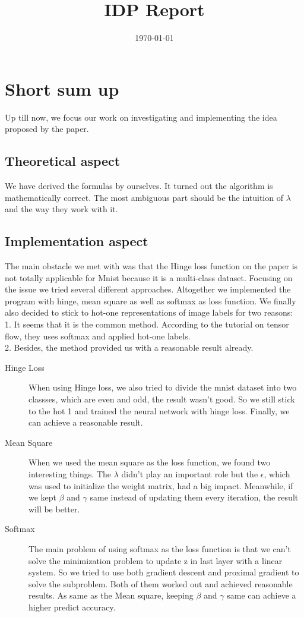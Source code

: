 \documentclass{article}
\title{IDP Report}
\date{\today}
\begin{document}
\maketitle

\section{Short sum up}
Up till now, we focus our work on investigating and implementing the idea proposed by the paper.
\subsection{Theoretical aspect}
We have derived the formulas by ourselves. It turned out the algorithm is mathematically correct. The most ambiguous part should be the intuition of $\lambda$ and the way they work with it. 

\subsection{Implementation aspect}
The main obstacle we met with was that the Hinge loss function on the paper is not totally applicable for Mnist  because it is a multi-class dataset. Focusing on the issue we tried several different approaches. Altogether we implemented the program with hinge, mean square as well as softmax as loss function. We finally also decided to stick to hot-one representations of image labels for two reasons:\\
1. It seems that it is the common method. According to the tutorial on tensor flow, they uses softmax and applied hot-one labels.\\
2. Besides, the method provided us with a reasonable result already.

\begin{description}
\item[Hinge Loss]
When using Hinge loss, we also tried to divide the mnist dataset into two classses, which are even and odd, the result wasn't good. So we still stick to the hot 1 and trained the neural network with hinge loss. Finally, we can achieve a reasonable result.

\item[Mean Square]
When we used the mean square as the loss function, we found two interesting things. The $\lambda$ didn't play an important role but the $\epsilon$, which was used to initialize the weight matrix, had a big impact. Meanwhile, if we kept $\beta$ and $\gamma$ same instead of updating them every iteration, the result will be better.

\item[Softmax]
The main problem of using softmax as the loss function is that we can't solve the minimization problem to update z in last layer with a linear system. So we tried to use both gradient descent and proximal gradient to solve the subproblem. Both of them worked out and achieved reasonable results. As same as the Mean square, keeping $\beta$ and $\gamma$ same can achieve a higher predict accuracy. 
\end{description}
\end{document}
